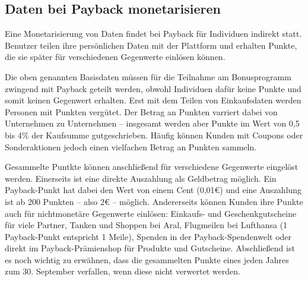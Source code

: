 \subsection{Daten bei Payback monetarisieren}
Eine Monetarisierung von Daten findet bei Payback für Individuen indirekt statt. Benutzer teilen ihre persönlichen Daten mit der Plattform und erhalten Punkte, die sie später für verschiedenen Gegenwerte einlösen können. \newline

\noindent Die oben genannten Basisdaten müssen für die Teilnahme am Bonusprogramm zwingend mit Payback geteilt werden, obwohl Individuen dafür keine Punkte und somit keinen Gegenwert erhalten. Erst mit dem Teilen von Einkaufsdaten werden Personen mit Punkten vergütet. Der Betrag an Punkten varriert dabei von Unternehmen zu Unternehmen -- insgesamt werden aber Punkte im Wert von 0,5 bis 4\% der Kaufsumme gutgeschrieben. Häufig können Kunden mit Coupons oder Sonderaktionen jedoch einen vielfachen Betrag an Punkten sammeln. \newline

\noindent Gesammelte Puntkte können anschließend für verschiedene Gegenwerte eingelöst werden. Einerseits ist eine direkte Auszahlung als Geldbetrag möglich. Ein Payback-Punkt hat dabei den Wert von einem Cent (0,01€) und eine Auszahlung ist ab 200 Punkten -- also 2€ -- möglich. \cite{Payback_Teilnahme} Andererseits können Kunden ihre Punkte auch für nichtmonetäre Gegenwerte einlösen: Einkaufs- und Geschenkgutscheine für viele Partner, Tanken und Shoppen bei Aral, Flugmeilen bei Lufthansa (1 Payback-Punkt entspricht 1 Meile), Spenden in der Payback-Spendenwelt oder direkt im Payback-Prämienshop für Produkte und Gutscheine. \cite{Payback_Einlösen} Abschließend ist es noch wichtig zu erwähnen, dass die gesammelten Punkte eines jeden Jahres zum 30. September verfallen, wenn diese nicht verwertet werden. \cite{Payback_Teilnahme}
